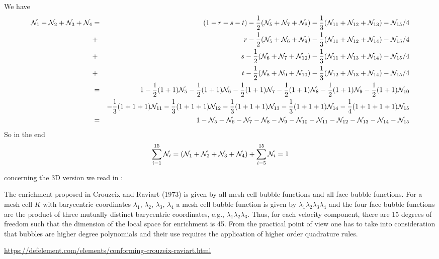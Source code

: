 We have
\begin{eqnarray}
{\mathcal{N}}_1+{\mathcal{N}}_2+{\mathcal{N}}_3+{\mathcal{N}}_4 
&=& (1-r-s-t) -\frac12 ({\mathcal{N}}_5+{\mathcal{N}}_7+{\mathcal{N}}_8)-\frac13({\mathcal{N}}_{11}+{\mathcal{N}}_{12}+{\mathcal{N}}_{13})-{\mathcal{N}}_{15}/4 \nonumber\\
&+& r-\frac12({\mathcal{N}}_5+{\mathcal{N}}_6+{\mathcal{N}}_9)    -\frac13({\mathcal{N}}_{11}+{\mathcal{N}}_{12}+{\mathcal{N}}_{14}) -{\mathcal{N}}_{15}/4 \\
&+& s-\frac12({\mathcal{N}}_6+{\mathcal{N}}_7+{\mathcal{N}}_{10}) -\frac13({\mathcal{N}}_{11}+{\mathcal{N}}_{13}+{\mathcal{N}}_{14}) -{\mathcal{N}}_{15}/4 \\
&+& t-\frac12({\mathcal{N}}_8+{\mathcal{N}}_9+{\mathcal{N}}_{10}) -\frac13({\mathcal{N}}_{12}+{\mathcal{N}}_{13}+{\mathcal{N}}_{14}) -{\mathcal{N}}_{15}/4 \\
&=& 1 -\frac12(1+1){\mathcal{N}}_5 -\frac12(1+1){\mathcal{N}}_6 -\frac12(1+1){\mathcal{N}}_7 -\frac12(1+1){\mathcal{N}}_8 -\frac12(1+1){\mathcal{N}}_9 -\frac12(1+1){\mathcal{N}}_{10}    \nonumber\\
&&  -\frac13(1+1+1){\mathcal{N}}_{11} -\frac13(1+1+1){\mathcal{N}}_{12} -\frac13(1+1+1){\mathcal{N}}_{13} -\frac13(1+1+1){\mathcal{N}}_{14} 
-\frac{1}{4}(1+1+1+1){\mathcal{N}}_{15} \nonumber\\
&=& 1 -{\mathcal{N}}_5 -{\mathcal{N}}_6 -{\mathcal{N}}_7 -{\mathcal{N}}_8 -{\mathcal{N}}_{9} -{\mathcal{N}}_{10}
      -{\mathcal{N}}_{11} -{\mathcal{N}}_{12} -{\mathcal{N}}_{13} -{\mathcal{N}}_{14} -{\mathcal{N}}_{15} 
\end{eqnarray}
So in the end
\[
\sum_{i=1}^{15} {\mathcal{N}}_i = ({\mathcal{N}}_1+{\mathcal{N}}_2+{\mathcal{N}}_3+{\mathcal{N}}_4)  + \sum_{i=5}^{15} {\mathcal{N}}_i = 1
\]

concerning the 3D version we read in \textcite{john16}:
\begin{displayquote}
{\color{darkgray}
The enrichment proposed in Crouzeix and Raviart (1973) is given
by all mesh cell bubble functions and all face bubble functions. For a mesh cell
$K$ with barycentric coordinates $\lambda_1$, $\lambda_2$, $\lambda_3$, 
$\lambda_4$  a mesh cell bubble function is given
by $\lambda_1 \lambda_2 \lambda_3 \lambda_4$ and the four 
face bubble functions are the product of three mutually
distinct barycentric coordinates, e.g., $\lambda_1 \lambda_2 \lambda_3$. 
Thus, for each velocity component,
there are 15 degrees of freedom such that the dimension of the local space for
enrichment is 45. From the practical point of view one has to take into consideration
that bubbles are higher degree polynomials and their use requires the application of
higher order quadrature rules.
}
\end{displayquote}

\begin{center}
\url{https://defelement.com/elements/conforming-crouzeix-raviart.html}
\end{center}



